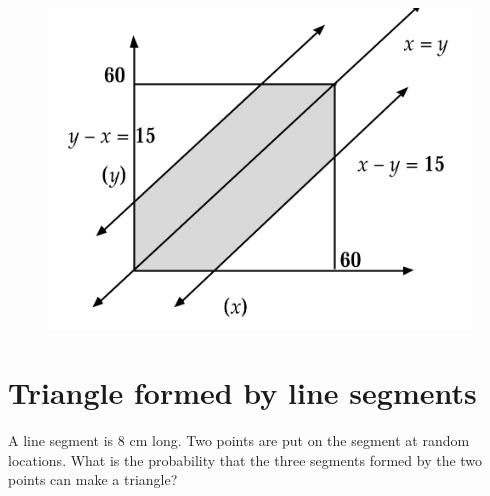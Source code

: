 \begin{solution}
\begin{figure}
    \centering
\includegraphics[width=0.4\linewidth]{figs/region3.png}
\end{figure}

\end{solution}

\section{Triangle formed by line segments}
\begin{problem} %
    A line segment is $8$ cm long. Two points are put on the segment at
random locations. What is the probability that the three segments formed by
the two points can make a triangle?
\end{problem}
\bigskip
